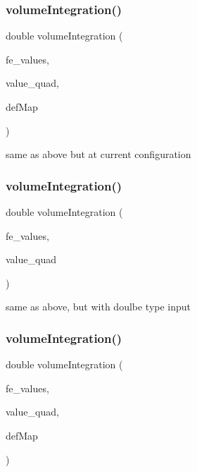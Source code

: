 \subsubsection{\texorpdfstring{volumeIntegration()}{volumeIntegration()}\hspace{0.1cm}{\footnotesize\ttfamily [4/6]}}
{\footnotesize\ttfamily double volume\+Integration (\begin{DoxyParamCaption}\item[{const F\+E\+Values$<$ dim $>$ \&}]{fe\+\_\+values,  }\item[{Table$<$ 1, Sacado\+::\+Fad\+::\+D\+Fad$<$ double $>$ $>$ \&}]{value\+\_\+quad,  }\item[{\mbox{\hyperlink{structdeformation_map}{deformation\+Map}}$<$ T, dim $>$ \&}]{def\+Map }\end{DoxyParamCaption})}

same as above but at current configuration \mbox{\label{class_residual_a734c1bb6a4a56aa1c774485441e47340}} 
\subsubsection{\texorpdfstring{volumeIntegration()}{volumeIntegration()}\hspace{0.1cm}{\footnotesize\ttfamily [5/6]}}
{\footnotesize\ttfamily double volume\+Integration (\begin{DoxyParamCaption}\item[{const F\+E\+Values$<$ dim $>$ \&}]{fe\+\_\+values,  }\item[{Table$<$ 1, double $>$ \&}]{value\+\_\+quad }\end{DoxyParamCaption})}

same as above, but with doulbe type input \mbox{\label{class_residual_ae097f5d9f2a92108cb0a1c7ecf4510c3}} 
\subsubsection{\texorpdfstring{volumeIntegration()}{volumeIntegration()}\hspace{0.1cm}{\footnotesize\ttfamily [6/6]}}
{\footnotesize\ttfamily double volume\+Integration (\begin{DoxyParamCaption}\item[{const F\+E\+Values$<$ dim $>$ \&}]{fe\+\_\+values,  }\item[{Table$<$ 1, double $>$ \&}]{value\+\_\+quad,  }\item[{\mbox{\hyperlink{structdeformation_map}{deformation\+Map}}$<$ T, dim $>$ \&}]{def\+Map }\end{DoxyParamCaption})}

